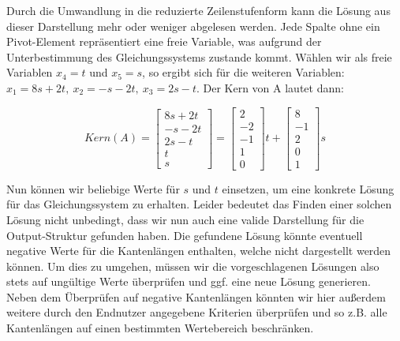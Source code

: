 Durch die Umwandlung in die reduzierte Zeilenstufenform kann die Lösung aus dieser Darstellung mehr oder weniger abgelesen werden. Jede Spalte ohne ein Pivot-Element
repräsentiert eine freie Variable, was aufgrund der Unterbestimmung des Gleichungssystems zustande kommt. Wählen wir als freie Variablen \(x_4 = t\) und
\(x_5 = s\), so ergibt sich für die weiteren Variablen: \(x_1 = 8s + 2t, \ x_2 = -s - 2t, \ x_3 = 2s - t\). Der Kern von A lautet dann:

\[
Kern(A) =
\begin{bmatrix}
    8s + 2t \\
    -s - 2t \\
    2s - t \\
    t \\
    s
\end{bmatrix}
=
\begin{bmatrix}
    2 \\ -2 \\ -1 \\ 1 \\ 0
\end{bmatrix}
t +
\begin{bmatrix}
    8 \\ -1 \\ 2 \\ 0 \\ 1
\end{bmatrix}
s
\]

Nun können wir beliebige Werte für \(s\) und \(t\) einsetzen, um eine konkrete Lösung für das Gleichungssystem zu erhalten. Leider bedeutet das Finden einer solchen
Lösung nicht unbedingt, dass wir nun auch eine valide Darstellung für die Output-Struktur gefunden haben. Die gefundene Lösung könnte eventuell negative Werte für
die Kantenlängen enthalten, welche nicht dargestellt werden können. Um dies zu umgehen, müssen wir die vorgeschlagenen Lösungen also stets auf ungültige Werte überprüfen
und ggf. eine neue Lösung generieren. Neben dem Überprüfen auf negative Kantenlängen könnten wir hier außerdem weitere durch den Endnutzer angegebene Kriterien überprüfen
und so z.B. alle Kantenlängen auf einen bestimmten Wertebereich beschränken.


